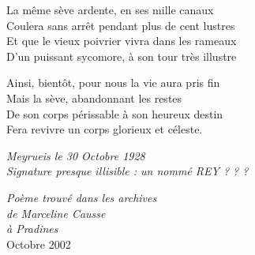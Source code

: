 \begin{center}
\begin{minipage}{0.55\textwidth}
La même sève ardente, en ses mille canaux\\
Coulera sans arrêt pendant plus de cent lustres\\
Et que le vieux poivrier vivra dans les rameaux\\
D’un puissant sycomore, à son tour très illustre

\vspace{0.35cm}

Ainsi, bientôt, pour nous la vie aura pris fin\\
Mais la sève, abandonnant les restes\\
De son corps périssable à son heureux destin\\
Fera revivre un corps glorieux et céleste.

\vspace{0.55cm}

\textit{Meyrueis le 30 Octobre 1928}\\
\textit{Signature presque illisible : un nommé REY ? ? ?}

\end{minipage}
\end{center}

\vfill

\begin{flushright}
\textit{Poème trouvé dans les archives}\\
\textit{de Marceline Causse}\\
\textit{à Pradines}\\[0.15cm]
Octobre 2002
\end{flushright}


\thispagestyle{empty}

